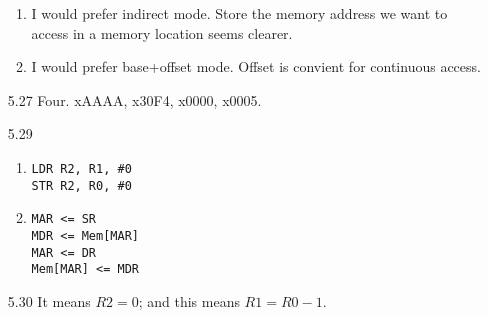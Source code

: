 \documentclass[a4paper]{article}
\begin{document}
\begin{enumerate}
\begin{enumerate}
\item I would prefer indirect mode. Store the memory address we want to access
  in a memory location seems clearer.
\item I would prefer base+offset mode. Offset is convient for
  continuous access.
\end{enumerate}
\item[5.27] Four. xAAAA, x30F4, x0000, x0005.
\item[5.29]
\begin{enumerate}
\item
\begin{verbatim}
LDR R2, R1, #0
STR R2, R0, #0
\end{verbatim}
\item
\begin{verbatim}
MAR <= SR
MDR <= Mem[MAR]
MAR <= DR
Mem[MAR] <= MDR
\end{verbatim}
\end{enumerate}
\item[5.30] It means $R2 = 0$; and this means $R1 = R0 - 1$. 
\end{enumerate}
\end{document}
